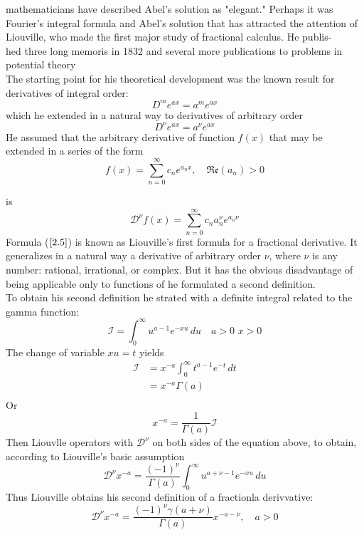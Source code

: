 \documentclass[twoside]{book}
\begin{document}
{mathematicians have described Abel's solution as "elegant." Perhaps it was Fourier's integral formula and Abel's solution that has attracted the attention of Liouville, who made the first major study of fractional calculus. He publis-\\hed three long memoris in 1832 and several more publications to problems in potential theory\\
The starting point for his theoretical development was the known result for derivatives of integral order:
$$D^m e^{ax} = a^m e^{ax}$$
which he extended in a natural way to derivatives of arbitrary order
$$D^{\nu} e^{ax} = a^{\nu} e^{ax}$$
He assumed that the arbitrary derivative of function $f(x)$ that may be extended in a series of the form
\begin{equation}
    \label{functionclass}
    f(x) = \sum_{n=0}^{\infty} c_n e^{a_n x} , \quad \mathfrak{Re}(a_n) > 0
\end{equation}

is
\begin{equation}
    \label{2.5}
    \mathcal{D}^{\nu}f(x) = \sum_{n=0}^{\infty} c_n a^{\nu}_{n} e^{a_n \nu}
\end{equation}
Formula ($\ref{2.5}$) is known as Liouville's first formula for a fractional derivative. It generalizes in a natural way a derivative of arbitrary order $\nu$, where $\nu$ is any number: rational, irrational, or complex. But it has the obvious disadvantage of being applicable only to functions of he formulated a second definition.\\
To obtain his second definition he strated with a definite integral related to the gamma function:
$$\mathscr{I} = \int_0^\infty u^{a-1} e^{-xu} \, du \quad a>0 \,\, x>0 $$
The change of variable $xu=t$ yields
\begin{align*}
    \mathscr{I} & = x^{-a} \int_0^\infty t^{a-1} e^{-t} \, dt \\
                & = x^{-a} \Gamma{(a)}                        \\
\end{align*}
Or
$$x^{-a} = \frac{1}{\Gamma{(a)}}\mathscr{I}$$
Then Liouvlle operators with $\mathcal{D}^{\nu}$ on both sides of the equation above, to obtain, according to Liouville's basic assumption
$$\mathcal{D}^\nu x^{-a} = \frac{(-1)^\nu}{\Gamma{(a)}} \int_0^\infty u^{a+\nu-1} e^{-xu} \, du$$
Thus Liouville obtains his second definition of a fractionla derivvative:
\begin{equation}
    \label{2.7}
    \mathcal{D}^{\nu} x^{-a} = \frac{(-1)^\nu \gamma{(a+\nu)}}{\Gamma{(a)}} x^{-a-\nu}, \quad a>0
\end{equation}


}
\end{document}
